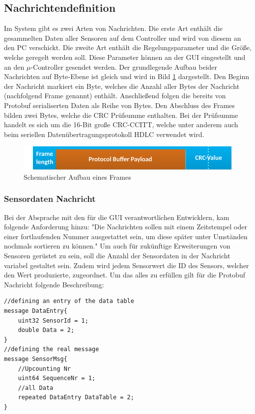 \subsection{Nachrichtendefinition}
Im System gibt es zwei Arten von Nachrichten. Die erste Art enthält die gesammelten Daten aller Sensoren auf dem Controller und wird von diesem an den PC verschickt. Die zweite Art enthält die Regelungsparameter und die Größe, welche geregelt werden soll. Diese Parameter können an der GUI eingestellt und an den $\mu$-Controller gesendet werden. Der grundlegende Aufbau beider Nachrichten auf Byte-Ebene ist gleich und wird in Bild \ref{fig:FrameOv} dargestellt. Den Beginn der Nachricht markiert ein Byte, welches die Anzahl aller Bytes der Nachricht (nachfolgend Frame genannt) enthält. Anschließend folgen die bereits von Protobuf serialiserten Daten als Reihe von Bytes. Den Abschluss des Frames bilden zwei Bytes, welche die CRC Prüfsumme enthalten. Bei der Prüfsumme handelt es sich um die 16-Bit große CRC-CCITT, welche unter anderem auch beim seriellen Datenübertragungsprotokoll HDLC verwendet wird. \cite[Absatz 1]{hdlcCrc}
\begin{figure}[h]
  \includegraphics[width=\textwidth]{MessageFormat}
  \caption{Schematischer Aufbau eines Frames}
  \label{fig:FrameOv}
\end{figure}
\subsubsection{Sensordaten Nachricht}
Bei der Absprache mit den für die GUI verantwortlichen Entwicklern, kam folgende Anforderung hinzu: "Die Nachrichten sollen mit einem Zeitstempel oder einer fortlaufenden Nummer ausgestattet sein, um diese später unter Umständen nochmals sortieren zu können." Um auch für zukünftige Erweiterungen von Sensoren gerüstet zu sein, soll die Anzahl der Sensordaten in der Nachricht variabel gestaltet sein. Zudem wird jedem Sensorwert die ID des Sensors, welcher den Wert produzierte, zugeordnet. Um das alles zu erfüllen gilt für die Protobuf Nachricht folgende Beschreibung:
\begin{lstlisting}[frame=single, caption=Beschreibung der Sensordaten Nachricht, label=lst:protoData]
//defining an entry of the data table
message DataEntry{
	uint32 SensorId = 1;
	double Data = 2;
}
//defining the real message
message SensorMsg{
	//Upcounting Nr
	uint64 SequenceNr = 1;
	//all Data
	repeated DataEntry DataTable = 2;
}
\end{lstlisting}
